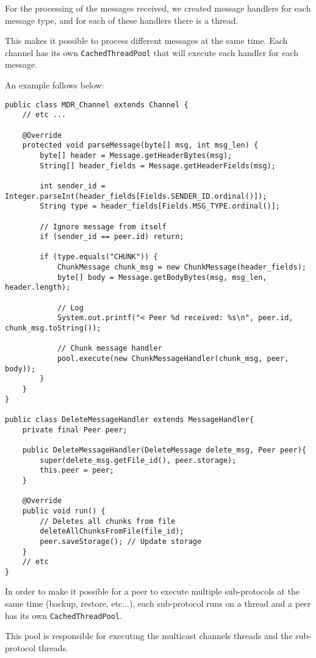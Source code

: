 \documentclass[11pt]{report}
\begin{document}
For the processing of the messages received, we created message handlers for each message type, and for each of these handlers there is a thread. 

This makes it possible to process different messages at the same time. Each channel has its own \texttt{CachedThreadPool} that will execute each handler for each message.

An example follows below:

\begin{verbatim}
public class MDR_Channel extends Channel {
    // etc ...

    @Override
    protected void parseMessage(byte[] msg, int msg_len) {
        byte[] header = Message.getHeaderBytes(msg);
        String[] header_fields = Message.getHeaderFields(msg);

        int sender_id = Integer.parseInt(header_fields[Fields.SENDER_ID.ordinal()]);
        String type = header_fields[Fields.MSG_TYPE.ordinal()];

        // Ignore message from itself
        if (sender_id == peer.id) return;

        if (type.equals("CHUNK")) {
            ChunkMessage chunk_msg = new ChunkMessage(header_fields);
            byte[] body = Message.getBodyBytes(msg, msg_len, header.length);
            
            // Log
            System.out.printf("< Peer %d received: %s\n", peer.id, chunk_msg.toString());
            
            // Chunk message handler
            pool.execute(new ChunkMessageHandler(chunk_msg, peer, body));
        }
    }
}

public class DeleteMessageHandler extends MessageHandler{
    private final Peer peer;

    public DeleteMessageHandler(DeleteMessage delete_msg, Peer peer){
        super(delete_msg.getFile_id(), peer.storage);
        this.peer = peer;
    }

    @Override
    public void run() {
        // Deletes all chunks from file
        deleteAllChunksFromFile(file_id);
        peer.saveStorage(); // Update storage
    }
    // etc
}
\end{verbatim}

In order to make it possible for a peer to execute multiple sub-protocols at the same time (backup, restore, etc...), each sub-protocol runs on a thread and a peer has its own \texttt{CachedThreadPool}. 

This pool is responsible for executing the multicast channels threads and the sub-protocol threads.
\end{document}
